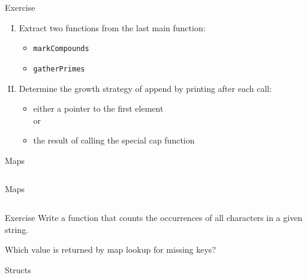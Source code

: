 \documentclass[10pt]{beamer}
\begin{document}
	\begin{frame}[fragile]{Exercise}
		\begin{enumerate}[I.]
			\item Extract two functions from the last main function:
				\begin{itemize}
					\item \texttt{markCompounds}
					\item \texttt{gatherPrimes}
				\end{itemize}
			\item Determine the growth strategy of append by printing after each call:
				\begin{itemize}
					\item either a pointer to the first element\\
					or\\
					\item the result of calling the special cap function
				\end{itemize}
		\end{enumerate}
	\end{frame}
		
	
	\begin{frame}[t,fragile]{Maps}
		\inputminted{go}{code/07_maps.go}
	\end{frame}
			
	
	\begin{frame}[t,fragile]{Maps}
		\inputminted{go}{code/07b_maps.go}
	\end{frame}
	
	
	\begin{frame}[fragile]{Exercise}
		Write a function that counts the occurrences of all characters in a given string.
	
		Which value is returned by map lookup for missing keys?
	\end{frame}
	
	
	\begin{frame}[t,fragile]{Structs}
		\inputminted{go}{code/08_structs.go}
	\end{frame}
		
\end{document}
